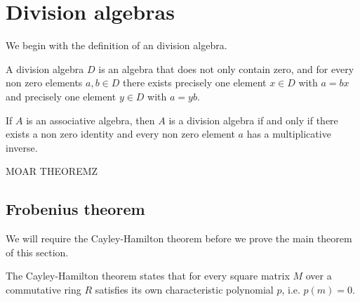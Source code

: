 \documentclass[../Thesis.tex]{subfiles}
\begin{document}
\section{Division algebras}
We begin with the definition of an division algebra.
\begin{mydef}
A division algebra $D$ is an algebra that does not only contain zero, and for every non zero elements $a,b \in D$ there exists precisely one element $x \in D$ with $a = bx$ and precisely one element $y \in D$ with $a = yb$.
\end{mydef}
\begin{lemma}
If $A$ is an associative algebra, then $A$ is a division algebra if and only if there exists a non zero identity and every non zero element $a$ has a multiplicative inverse.
\end{lemma}

MOAR THEOREMZ
\subsection{Frobenius theorem}
We will require the Cayley-Hamilton theorem before we prove the main theorem of this section.

\begin{theorem}
The Cayley-Hamilton theorem states that for every square matrix $M$ over a commutative ring $R$ satisfies its own characteristic polynomial $p$, i.e. $p(m) = 0$.
\end{theorem}
\end{document}
